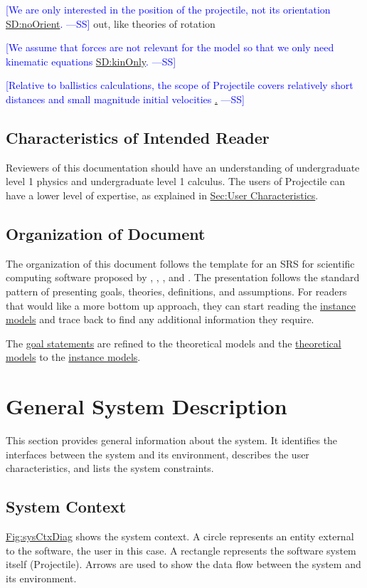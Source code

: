 \documentclass[12pt]{article}
\newcommand{\authornote}[3]{\textcolor{#1}{[#3 ---#2]}}
\newcommand{\authornote}[3]{}
\newcommand{\wss}[1]{\authornote{blue}{SS}{#1}}
\begin{document}
\wss{We are only interested in the position of the projectile, not its
orientation \hyperref[SD:noOrient]{SD:noOrient}.} %
out, like theories of rotation

\wss{We assume that forces are not relevant for the model so that we only need
kinematic equations \hyperref[SD:kinOnly]{SD:kinOnly}.}

\wss{Relative to ballistics calculations, the scope of Projectile covers
relatively short distances and small magnitude initial velocities
\hyperref[SD:shrtDstSmlMag].} 

\subsection{Characteristics of Intended Reader}
\label{Sec:ReaderChars}
Reviewers of this documentation should have an understanding of undergraduate level 1 physics and undergraduate level 1 calculus. The users of Projectile can have a lower level of expertise, as explained in \hyperref[Sec:UserChars]{Sec:User Characteristics}.

\subsection{Organization of Document}
\label{Sec:DocOrg}
The organization of this document follows the template for an SRS for scientific computing software proposed by \cite{koothoor2013}, \cite{smithLai2005}, \cite{smithEtAl2007}, and \cite{smithKoothoor2016}. The presentation follows the standard pattern of presenting goals, theories, definitions, and assumptions. For readers that would like a more bottom up approach, they can start reading the \hyperref[Sec:IMs]{instance models} and trace back to find any additional information they require.

The \hyperref[Sec:GoalStmt]{goal statements} are refined to the theoretical models and the \hyperref[Sec:TMs]{theoretical models} to the \hyperref[Sec:IMs]{instance models}.

\section{General System Description}
\label{Sec:GenSysDesc}
This section provides general information about the system. It identifies the interfaces between the system and its environment, describes the user characteristics, and lists the system constraints.

\subsection{System Context}
\label{Sec:SysContext}
\hyperref[Figure:sysCtxDiag]{Fig:sysCtxDiag} shows the system context. A circle represents an entity external to the software, the user in this case. A rectangle represents the software system itself (Projectile). Arrows are used to show the data flow between the system and its environment.
\end{document}
